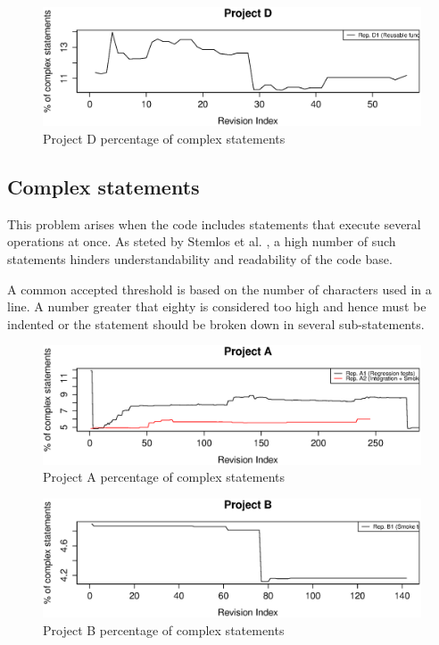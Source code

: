 \begin{figure}[!htbp]
    \centering
    \includegraphics[width=\textwidth]{figure/results/rq1/statement_complexity_project_d.eps}
    \caption{Project D percentage of complex statements}
    \label{fig:statement_complexity_project_d}
\end{figure}

\FloatBarrier


\subsection{Complex statements}
This problem arises when the code includes statements that execute several operations at once. As steted by Stemlos et al. \cite{metrics_source_code}, a high number of such statements hinders understandability and readability of the code base.

A common accepted threshold is based on the number of characters used in a line. A number greater that eighty is considered too high and hence must be indented or the statement should be broken down in several sub-statements.

\begin{figure}[!htbp]
    \centering
    \includegraphics[width=\textwidth]{figure/results/rq1/statement_complexity_project_a.eps}
    \caption{Project A percentage of complex statements}
    \label{fig:statement_complexity_project_a}
\end{figure}

\begin{figure}[!htbp]
    \centering
    \includegraphics[width=\textwidth]{figure/results/rq1/statement_complexity_project_b.eps}
    \caption{Project B percentage of complex statements}
    \label{fig:statement_complexity_project_b}
\end{figure}

